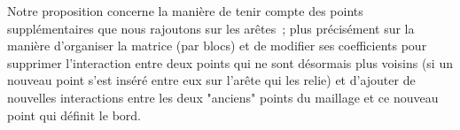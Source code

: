 \documentclass[12pt]{article}
\begin{document}
\vspace{5 mm}

\noindent
Notre proposition concerne la manière de tenir compte des points supplémentaires que nous rajoutons sur les arêtes~; plus précisément sur la manière d'organiser la matrice (par blocs) et de modifier ses coefficients pour supprimer l'interaction entre deux points qui ne sont désormais plus voisins (si un nouveau point s'est inséré entre eux sur l'arête qui les relie) et d'ajouter de nouvelles interactions entre les deux "anciens" points du maillage et ce nouveau point qui définit le bord.
\end{document}

